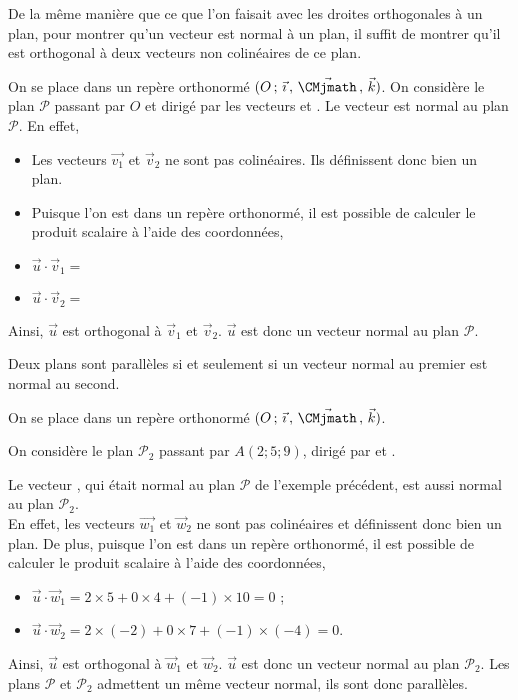 \documentclass[11pt,fleqn, openany]{book} %
\begin{document}
De la même manière que ce que l'on faisait avec les droites orthogonales à un plan, pour montrer qu'un vecteur est normal à un plan, il suffit de montrer qu'il est orthogonal à deux vecteurs non colinéaires de ce plan.

\begin{example}On se place dans un repère orthonormé $\Oijk$. On considère le plan $\mathcal{P}$ passant par $O$ et dirigé par les vecteurs \renewcommand{\arraystretch}{1} et \renewcommand{\arraystretch}{1}. Le vecteur \renewcommand{\arraystretch}{1} est  normal au plan $\mathcal{P}$. En effet,
\begin{itemize}
\item Les vecteurs $\vec{v_1}$ et $\vec{v}_2$ ne sont pas colinéaires. Ils définissent donc bien un plan.
\item Puisque l'on est dans un repère orthonormé, il est possible de calculer le produit scalaire à l'aide des coordonnées,
\item $ \vec u \cdot \vec v_1 = $
\item $\vec u \cdot \vec v_2 = $
\end{itemize}
Ainsi, $\vec u$ est orthogonal à $\vec v_1$ et $\vec v_2$. $\vec u$ est donc un vecteur normal au plan $\mathcal{P}$.\end{example}

\begin{proposition}Deux plans sont parallèles si et seulement si un vecteur normal au premier est normal au second.\end{proposition}

\begin{example}On se place dans un repère orthonormé $\Oijk$. 

On considère le plan $\mathcal{P}_2$ passant par $A(2;5;9)$, dirigé par \renewcommand{\arraystretch}{1} et \renewcommand{\arraystretch}{1}. 

Le vecteur \renewcommand{\arraystretch}{1}, qui était normal au plan $\mathcal{P}$ de l'exemple précédent, est aussi normal au plan $\mathcal{P}_2$.\\ En effet, les vecteurs $\vec{w_1}$ et $\vec{w}_2$ ne sont pas colinéaires et définissent donc bien un plan.
De plus, puisque l'on est dans un repère orthonormé, il est possible de calculer le produit scalaire à l'aide des coordonnées,
\begin{itemize}\item $ \vec u \cdot \vec w_1 = 2 \times 5 + 0 \times 4 + (-1) \times 10 = 0$ ;
\item $\vec u \cdot \vec w_2 = 2 \times (-2) + 0 \times 7 + (-1) \times (-4) = 0$.
\end{itemize}
Ainsi, $\vec u$ est orthogonal à $\vec w_1$ et $\vec w_2$. $\vec u$ est donc un vecteur normal au plan $\mathcal{P}_2$. Les plans $\mathcal{P}$ et $\mathcal{P}_2$ admettent un même vecteur normal, ils sont donc parallèles.\end{example}
\end{document}
